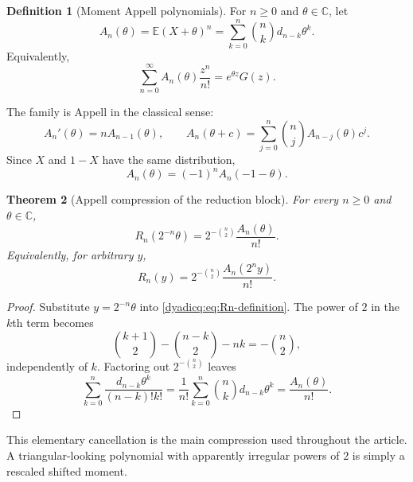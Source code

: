 \documentclass[11pt,oneside]{article}
\newtheorem{theorem}{Theorem}[section]
\theoremstyle{definition}
\newtheorem{definition}[theorem]{Definition}
\theoremstyle{remark}
\newcommand{\C}{\mathbb C}
\newcommand{\E}{\mathbb E}
\begin{document}
\begin{definition}[Moment Appell polynomials]\label{dyadicq:def:Appell}
For $n\ge0$ and $\theta\in\C$, let
\begin{equation}\label{dyadicq:eq:An-definition}
  A_n(\theta)=\E(X+\theta)^n
  =\sum_{k=0}^{n}\binom nk d_{n-k}\theta^k.
\end{equation}
Equivalently,
\begin{equation}\label{dyadicq:eq:Appell-egf}
  \sum_{n=0}^{\infty}A_n(\theta)\frac{z^n}{n!}
  =e^{\theta z}G(z).
\end{equation}
\end{definition}

The family is Appell in the classical sense:
\begin{equation}\label{dyadicq:eq:Appell-derivative}
  A_n'(\theta)=nA_{n-1}(\theta),
  \qquad
  A_n(\theta+c)=\sum_{j=0}^{n}\binom nj A_{n-j}(\theta)c^j.
\end{equation}
Since $X$ and $1-X$ have the same distribution,
\begin{equation}\label{dyadicq:eq:Appell-reflection}
  A_n(\theta)=(-1)^nA_n(-1-\theta).
\end{equation}

\begin{theorem}[Appell compression of the reduction block]\label{dyadicq:thm:Appell-compression}
For every $n\ge0$ and $\theta\in\C$,
\begin{equation}\label{dyadicq:eq:Appell-compression}
  R_n(2^{-n}\theta)
  =2^{-\binom n2}\frac{A_n(\theta)}{n!}.
\end{equation}
Equivalently, for arbitrary $y$,
\begin{equation}\label{dyadicq:eq:R-Appell-general}
  R_n(y)=2^{-\binom n2}\frac{A_n(2^ny)}{n!}.
\end{equation}
\end{theorem}

\begin{proof}
Substitute $y=2^{-n}\theta$ into \eqref{dyadicq:eq:Rn-definition}.  The power of $2$
in the $k$th term becomes
\[
 \binom{k+1}{2}-\binom{n-k}{2}-nk=-\binom n2,
\]
independently of $k$.  Factoring out $2^{-\binom n2}$ leaves
\[
 \sum_{k=0}^{n}\frac{d_{n-k}\theta^k}{(n-k)!k!}
 =\frac1{n!}\sum_{k=0}^{n}\binom nkd_{n-k}\theta^k
 =\frac{A_n(\theta)}{n!}.
\]
\end{proof}

This elementary cancellation is the main compression used throughout the
article.  A triangular-looking polynomial with apparently irregular powers of
$2$ is simply a rescaled shifted moment.
\end{document}
